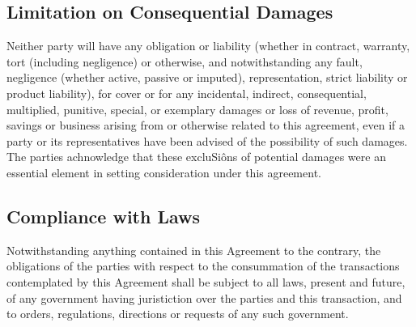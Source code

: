 \documentclass[letterpaper,10pt,english]{sphinxmanual}
\begin{document}
\subsection{Limitation on Consequential Damages}
\label{\detokenize{7-miscellaneous:limitation-on-consequential-damages}}
Neither party will have any obligation or liability (whether in contract, warranty, tort (including negligence) or otherwise, and notwithstanding any fault, negligence (whether active, passive or imputed), representation, strict liability or product liability), for cover or for any incidental, indirect, consequential, multiplied, punitive, special, or exemplary damages or loss of revenue, profit, savings or business arising from or otherwise related to this agreement, even if a party or its representatives have been advised of the possibility of such damages. The parties achnowledge that these excluSiôns of potential damages were an essential element in setting consideration under this agreement.


\subsection{Compliance with Laws}
\label{\detokenize{7-miscellaneous:compliance-with-laws}}
Notwithstanding anything contained in this Agreement to the contrary, the obligations of the parties with respect to the consummation of the transactions contemplated by this Agreement shall be subject to all laws, present and future, of any government having juristiction over the parties and this transaction, and to orders, regulations, directions or requests of any such government.
\end{document}
